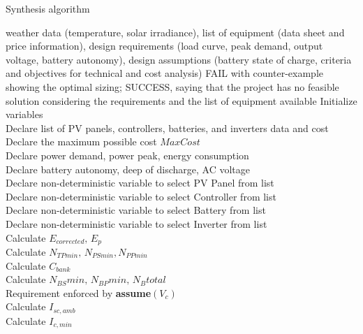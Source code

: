  \begin{algorithm}
 \caption{Synthesis algorithm}
 \begin{algorithmic}[1]
 \renewcommand{\algorithmicrequire}{\textbf{Input:}}
 \renewcommand{\algorithmicensure}{\textbf{Output:}}
  \REQUIRE weather data (temperature, solar irradiance), list of equipment (data sheet and price information), design requirements (load curve, peak demand, output voltage, battery autonomy), design assumptions (battery state of charge, criteria and objectives for technical and cost analysis)
 \ENSURE FAIL with counter-example showing the optimal sizing; SUCCESS, saying that the project has no feasible solution considering the requirements and the list of equipment available
  \STATE Initialize variables \\
  \STATE Declare list of PV panels, controllers, batteries, and inverters data and cost \\
  \STATE Declare the maximum possible cost $MaxCost$  \\
  \STATE Declare power demand, power peak, energy consumption \\
  \STATE Declare battery autonomy, deep of discharge, AC voltage \\
 	\STATE Declare non-deterministic variable to select PV Panel from list \\
 	\STATE Declare non-deterministic variable to select Controller from list \\
 	\STATE Declare non-deterministic variable to select Battery from list \\
 	\STATE Declare non-deterministic variable to select Inverter from list \\ 	
 	\STATE Calculate $E_{corrected}, \, E_{p} $ \\
	\STATE Calculate $N_{TPmin}, \, N_{PSmin}, N_{PPmin} $ \\
 	\STATE Calculate $C_{bank}$ \\
	\STATE Calculate $N_{BS}min, \, N_{BP}min, \, N_{B}total$ \\
	\STATE Requirement enforced by \textbf{assume}$(V_{c})$ \\
 	\STATE Calculate $I_{sc,amb}$ \\
 	\STATE Calculate $I_{c,min}$ \\

\end{algorithmic}
\end{algorithm}
